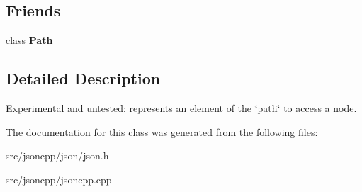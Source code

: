 \subsection*{Friends}
\begin{DoxyCompactItemize}
\item 
class {\bfseries Path}\hypertarget{classJson_1_1PathArgument_a4877239a6b7f09fbf5a61ca68a49d74c}{}\label{classJson_1_1PathArgument_a4877239a6b7f09fbf5a61ca68a49d74c}

\end{DoxyCompactItemize}


\subsection{Detailed Description}
Experimental and untested\+: represents an element of the \char`\"{}path\char`\"{} to access a node. 

The documentation for this class was generated from the following files\+:\begin{DoxyCompactItemize}
\item 
src/jsoncpp/json/json.\+h\item 
src/jsoncpp/jsoncpp.\+cpp\end{DoxyCompactItemize}
